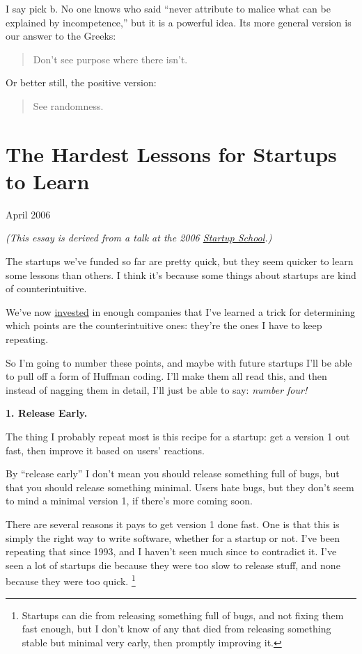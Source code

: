 \documentclass[12pt]{book}
\begin{document}
I say pick b. No one knows who said ``never attribute to malice what can
be explained by incompetence,'' but it is a powerful idea. Its more
general version is our answer to the Greeks:

\begin{quote}
Don't see purpose where there isn't.
\end{quote}

Or better still, the positive version:

\begin{quote}
See randomness.
\end{quote}
\chapter{The Hardest Lessons for Startups to Learn}

April 2006

\emph{(This essay is derived from a talk at the 2006
\href{http://startupschool.org}{Startup School}.)}

The startups we've funded so far are pretty quick, but they seem quicker
to learn some lessons than others. I think it's because some things
about startups are kind of counterintuitive.

We've now \href{http://ycombinator.com}{invested} in enough companies
that I've learned a trick for determining which points are the
counterintuitive ones: they're the ones I have to keep repeating.

So I'm going to number these points, and maybe with future startups I'll
be able to pull off a form of Huffman coding. I'll make them all read
this, and then instead of nagging them in detail, I'll just be able to
say: \emph{number four!}

\textbf{1. Release Early.}

The thing I probably repeat most is this recipe for a startup: get a
version 1 out fast, then improve it based on users' reactions.

By ``release early'' I don't mean you should release something full of
bugs, but that you should release something minimal. Users hate bugs,
but they don't seem to mind a minimal version 1, if there's more coming
soon.

There are several reasons it pays to get version 1 done fast. One is
that this is simply the right way to write software, whether for a
startup or not. I've been repeating that since 1993, and I haven't seen
much since to contradict it. I've seen a lot of startups die because
they were too slow to release stuff, and none because they were too
quick. \footnote{Startups can die from releasing something full of bugs, and not
fixing them fast enough, but I don't know of any that died from
releasing something stable but minimal very early, then promptly
improving it.}
\end{document}
